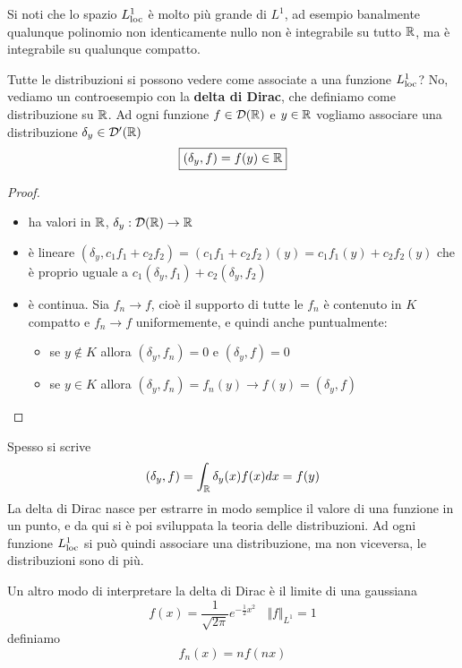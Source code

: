 Si noti che lo spazio $L^{1}_{\operatorname{loc}}$ è molto più grande di $L^{1}$, ad esempio banalmente qualunque polinomio non identicamente nullo non è integrabile su tutto $\mathbb{R}$, ma è integrabile su qualunque compatto.

Tutte le distribuzioni si possono vedere come associate a una funzione $L^{1}_{\operatorname{loc}}$? No, vediamo un controesempio con la \textbf{delta di Dirac}, che definiamo come distribuzione su $\mathbb{R}$. Ad ogni funzione $f\in \mathcal{D}(\mathbb{R})$ e $y\in \mathbb{R}$ vogliamo associare una distribuzione $\delta_{y} \in \mathcal{D}'(\mathbb{R})$
\begin{equation*}
\boxed{(\delta_{y}, f) = f(y) \in \mathbb{R}}
\end{equation*}
\begin{proof}\leavevmode
\begin{itemize}
\item ha valori in $\mathbb{R}$, $\delta_{y} : \mathcal{D}(\mathbb{R})\rightarrow \mathbb{R}$
\item è lineare $(\delta_{y}, c_{1} f_{1} + c_{2} f_{2}) = (c_{1} f_{1} + c_{2} f_{2})(y) = c_{1} f_{1}(y) + c_{2} f_{2}(y)$ che è proprio uguale a $c_{1}(\delta_{y}, f_{1}) + c_{2}(\delta_{y}, f_{2})$
\item è continua. Sia $f_{n}\rightarrow f$, cioè il supporto di tutte le $f_{n}$ è contenuto in $K$ compatto e $f_{n}\rightarrow f$ uniformemente, e quindi anche puntualmente:
\begin{itemize}
\item se $y\notin K$ allora $(\delta_{y}, f_{n}) = 0$ e $(\delta_{y}, f) = 0$
\item se $y\in K$ allora $(\delta_{y}, f_{n}) = f_{n}(y)\rightarrow f(y) = (\delta_{y}, f)$
\end{itemize}

\end{itemize}
\end{proof}
Spesso si scrive
\begin{equation*}
(\delta_{y}, f) = \int_{\mathbb{R}} \delta_{y}(x) f(x) dx = f(y)
\end{equation*}
La delta di Dirac nasce per estrarre in modo semplice il valore di una funzione in un punto, e da qui si è poi sviluppata la teoria delle distribuzioni. Ad ogni funzione $L^{1}_{\operatorname{loc}}$ si può quindi associare una distribuzione, ma non viceversa, le distribuzioni sono di più.

Un altro modo di interpretare la delta di Dirac è il limite di una gaussiana
\begin{equation*}
f(x) = \frac{1}{\sqrt{2\pi}} e^{- \frac{1}{2} x^{2}} \ \ \ \ \Vert f \Vert_{L^{1}} = 1
\end{equation*}
definiamo
\begin{equation*}
f_{n}(x) = nf(nx)
\end{equation*}

